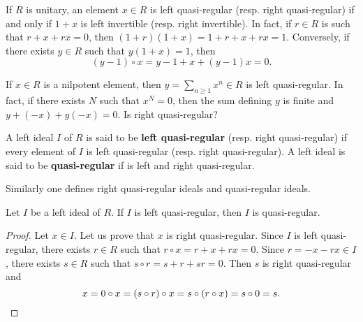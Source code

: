 If $R$ is unitary, an element $x\in R$ is left quasi-regular (resp. right quasi-regular)
if and only if $1+x$ is left invertible (resp. right invertible). In fact, 
if $r\in R$ is such that $r+x+rx=0$, then $(1+r)(1+x)=1+r+x+rx=1$.
Conversely, if there exists $y\in R$ such that $y(1+x)=1$, then  
\[
(y-1)\circ x=y-1+x+(y-1)x=0.
\]

\begin{example}
	If $x\in R$ is a nilpotent element, 
    then $y=\sum_{n\geq1}x^n\in R$ is left quasi-regular. 
	In fact, if there exists $N$ such that $x^N=0$, 
    then the sum defining $y$ is finite 
    and $y+(-x)+y(-x)=0$.  Is right quasi-regular?
\end{example}

\begin{definition}
A left ideal $I$ of $R$ is said to be 
\textbf{left quasi-regular} (resp. right quasi-regular) if every element of $I$ is
left quasi-regular (resp. right quasi-regular). A left ideal 
is said to be \textbf{quasi-regular} if is left and right quasi-regular. 
\end{definition}

Similarly 
one defines right quasi-regular ideals and quasi-regular ideals. 

\begin{lemma}
	\label{lemma:casiregular}
	Let $I$ be a left ideal of $R$. If $I$ is left quasi-regular, then 
	$I$ is quasi-regular.
\end{lemma}

\begin{proof}
	Let $x\in I$. Let us prove that $x$ is right quasi-regular. Since $I$ is
	left quasi-regular, there exists $r\in R$ such that $r\circ x=r+x+rx=0$. Since 
	$r=-x-rx\in I$, there exists $s\in R$ such that $s\circ
	r=s+r+sr=0$. Then $s$ is right quasi-regular and  
	\[
	x=0\circ x=(s\circ r)\circ x=s\circ (r\circ x)=s\circ 0=s.\qedhere
	\]
\end{proof}

